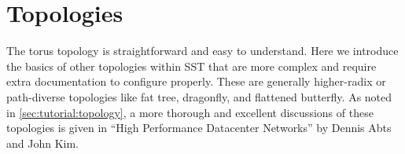 
\chapter{Topologies}
\label{chapter:topologies}

The torus topology is straightforward and easy to understand.
Here we introduce the basics of other topologies within SST that are more complex and require extra documentation to configure properly.
These are generally higher-radix or path-diverse topologies like fat tree, dragonfly, and flattened butterfly.
As noted in \ref{sec:tutorial:topology}, a more thorough and excellent discussions of these topologies is given in ``High Performance Datacenter Networks'' by Dennis Abts and John Kim.

%
%
%
%
%
%
%
%
%








